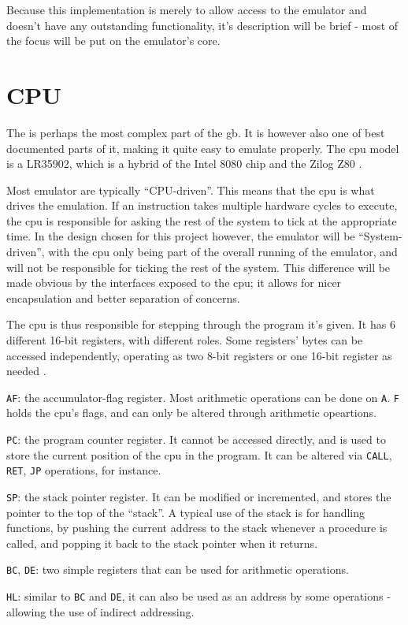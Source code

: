 \documentclass[11pt]{report}
\begin{document}
Because this implementation is merely to allow access to the emulator and doesn't have any outstanding functionality, it's description will be brief - most of the focus will be put on the emulator's core.

\section{CPU}

The  is perhaps the most complex part of the \gls{gb}. It is however also one of best documented parts of it, making it quite easy to emulate properly. The \gls{cpu} model is a LR35902, which is a hybrid of the Intel 8080 chip and the Zilog Z80 \cite{gbcpumanual}.

Most emulator are typically ``CPU-driven''. This means that the \gls{cpu} is what drives the emulation. If an instruction takes multiple hardware cycles to execute, the \gls{cpu} is responsible for asking the rest of the system to tick at the appropriate time. In the design chosen for this project however, the emulator will be ``System-driven'', with the \gls{cpu} only being part of the overall running of the emulator, and will not be responsible for ticking the rest of the system. This difference will be made obvious by the interfaces exposed to the \gls{cpu}; it allows for nicer encapsulation and better separation of concerns.

The \gls{cpu} is thus responsible for stepping through the program it's given. It has 6 different 16-bit registers, with different roles. Some registers' bytes can be accessed independently, operating as two 8-bit registers or one 16-bit register as needed \cite[CPU Registers and Flags]{pandoc}.

\begin{compactitem}
	\item \texttt{AF}: the accumulator-flag register. Most arithmetic operations can be done on \texttt{A}. \texttt{F} holds the \gls{cpu}'s flags, and can only be altered through arithmetic opeartions.
	\item \texttt{PC}: the program counter register. It cannot be accessed directly, and is used to store the current position of the \gls{cpu} in the program. It can be altered via \texttt{CALL}, \texttt{RET}, \texttt{JP} operations, for instance.
	\item \texttt{SP}: the stack pointer register. It can be modified or incremented, and stores the pointer to the top of the ``stack''. A typical use of the stack is for handling functions, by pushing the current address to the stack whenever a procedure is called, and popping it back to the stack pointer when it returns.
	\item \texttt{BC}, \texttt{DE}: two simple registers that can be used for arithmetic operations.
	\item \texttt{HL}: similar to \texttt{BC} and \texttt{DE}, it can also be used as an address by some operations - allowing the use of indirect addressing.
\end{compactitem}
\end{document}
